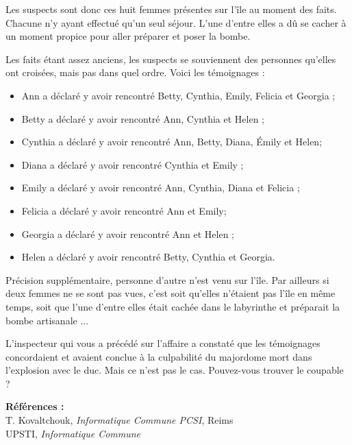 Les suspects sont donc ces huit femmes présentes sur l'île au moment des faits. Chacune n'y ayant effectué qu'un seul
séjour. L'une d'entre elles a dû se cacher à un moment propice pour aller préparer et poser la bombe.

Les faits étant assez anciens, les suspects se souviennent des personnes qu'elles ont croisées, mais pas dans quel ordre. Voici les témoignages :

\begin{itemize}
\item Ann a déclaré y avoir rencontré Betty, Cynthia, Emily, Felicia et Georgia ;
\item Betty a déclaré y avoir rencontré Ann, Cynthia et Helen ;
\item Cynthia a déclaré y avoir rencontré Ann, Betty, Diana, Émily et Helen;
\item Diana a déclaré y avoir rencontré Cynthia et Emily ;
\item Emily a déclaré y avoir rencontré Ann, Cynthia, Diana et Felicia ;
\item Felicia a déclaré y avoir rencontré Ann et Emily;
\item Georgia a déclaré y avoir rencontré Ann et Helen ;
\item Helen a déclaré y avoir rencontré Betty, Cynthia et Georgia.
\end{itemize}

\medskip 
Précision supplémentaire, personne d'autre n'est venu sur l'île. Par ailleurs si deux femmes ne se sont pas vues,
c'est soit qu'elles n'étaient pas l'île en même temps, soit que l'une d'entre elles était cachée dans le labyrinthe et préparait la bombe artisanale ... 

\medskip
L'inspecteur qui vous a précédé sur l'affaire a constaté que les témoignages concordaient et avaient conclue
à la culpabilité du majordome mort dans l'explosion avec le duc. Mais ce n'est pas le cas. Pouvez-vous trouver le coupable ?


\vfill
\textbf{Références :}\\
T. Kovaltchouk, \textit{Informatique Commune PCSI}, Reims\\
UPSTI, \textit{Informatique Commune}



\newpage
\renewcommand{\contentsname}{Plan du cours}
\tableofcontents



